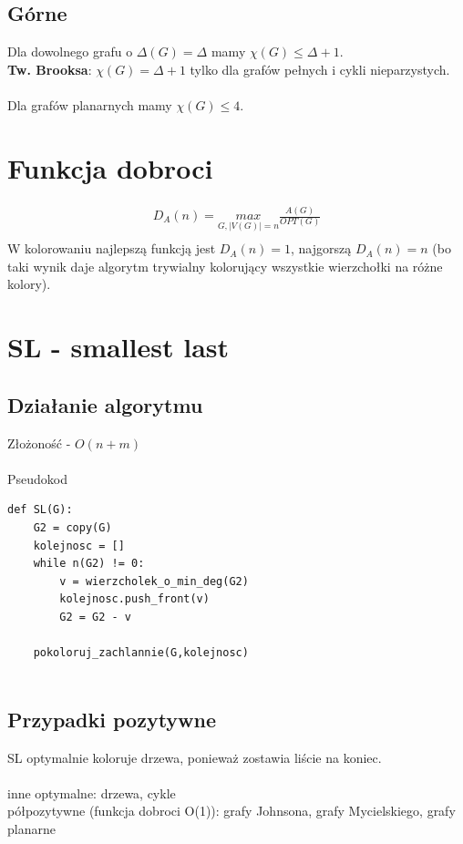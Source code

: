 \documentclass{article}
\begin{document}
\subsection{Górne}
Dla dowolnego grafu o $\Delta(G) = \Delta$ mamy $\chi(G) \leq \Delta + 1$.  \\
\textbf{Tw. Brooksa}: $\chi(G) = \Delta + 1$ tylko dla grafów pełnych i cykli nieparzystych. \\\\
Dla grafów planarnych mamy $\chi(G) \leq 4$.


\section{Funkcja dobroci}

\begin{gather*}
	D_A(n) =\underset{G, |V(G)| = n}{max} \frac{A(G)}{OPT(G)} \\
\end{gather*} 
W kolorowaniu najlepszą funkcją jest $D_A(n) = 1$, najgorszą $D_A(n) = n$ (bo taki wynik daje algorytm trywialny kolorujący wszystkie wierzchołki na różne kolory).


\section{SL - smallest last}

\subsection{Działanie algorytmu}
Złożoność -  $O(n+m)$ \\\\
Pseudokod
\begin{lstlisting}
def SL(G):
	G2 = copy(G)
	kolejnosc = []
	while n(G2) != 0:
		v = wierzcholek_o_min_deg(G2)
		kolejnosc.push_front(v)
		G2 = G2 - v

	pokoloruj_zachlannie(G,kolejnosc)
		
\end{lstlisting}

\subsection{Przypadki pozytywne}

SL optymalnie koloruje drzewa, ponieważ zostawia liście na koniec. \\\\
inne optymalne: drzewa, cykle \\
półpozytywne (funkcja dobroci O(1)): grafy Johnsona, grafy Mycielskiego, grafy planarne
\end{document}
